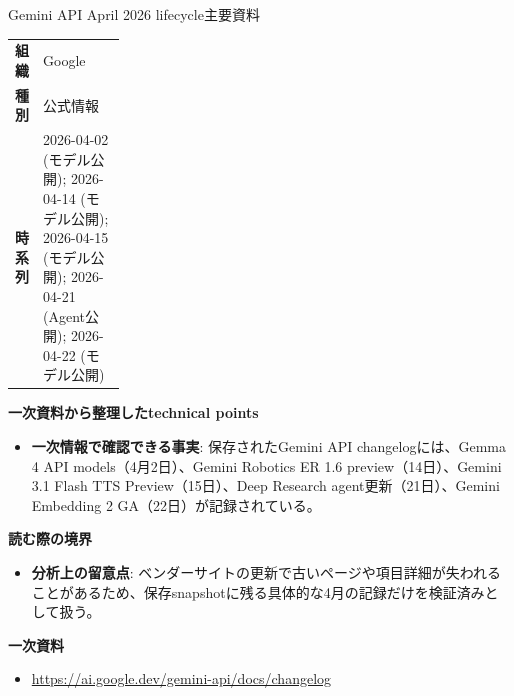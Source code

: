 \begin{technicalnote}{Gemini API April 2026 lifecycle}{主要資料}
\begingroup
\begin{tabularx}{\linewidth}{@{}>{\bfseries}p{0.22\linewidth}X@{}}
組織 & Google \\
種別 & 公式情報 \\
時系列 & 2026-04-02 (モデル公開); 2026-04-14 (モデル公開); 2026-04-15 (モデル公開); 2026-04-21 (Agent公開); 2026-04-22 (モデル公開) \\
\end{tabularx}
\smallskip
{\bfseries 一次資料から整理したtechnical points}
\begin{itemize}[leftmargin=1.5em,itemsep=0.35em]
\item \textbf{一次情報で確認できる事実}: 保存されたGemini API changelogには、Gemma 4 API models（4月2日）、Gemini Robotics ER 1.6 preview（14日）、Gemini 3.1 Flash TTS Preview（15日）、Deep Research agent更新（21日）、Gemini Embedding 2 GA（22日）が記録されている。
\end{itemize}
\begin{minipage}{\linewidth}
{\bfseries 読む際の境界}
\begin{itemize}[leftmargin=1.5em,itemsep=0.35em]
\item \textbf{分析上の留意点}: ベンダーサイトの更新で古いページや項目詳細が失われることがあるため、保存snapshotに残る具体的な4月の記録だけを検証済みとして扱う。
\end{itemize}
\begin{samepage}
{\bfseries 一次資料}
\begingroup\sloppy
\begin{itemize}[leftmargin=1.5em,itemsep=0.25em]
\item {\scriptsize\url{https://ai.google.dev/gemini-api/docs/changelog}}
\end{itemize}
\endgroup
\end{samepage}
\end{minipage}
\endgroup
\end{technicalnote}
\medskip

